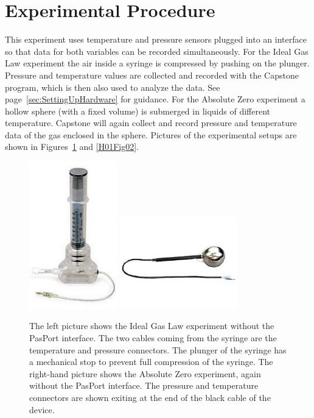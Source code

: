 \section{Experimental Procedure}

This experiment uses temperature and pressure sensors plugged into an interface so that data for both variables can be recorded simultaneously.
For the Ideal Gas Law experiment the air inside a syringe is compressed by pushing on the plunger. Pressure and temperature values are collected and recorded with the Capstone program, which is then also used to analyze the data. See page~\ref{sec:SettingUpHardware} for guidance.
For the Absolute Zero experiment a hollow sphere (with a fixed volume) is submerged in liquids of different temperature. Capstone will again collect and record pressure and temperature data of the gas enclosed in the sphere.
Pictures of the experimental setups are shown in Figures~\ref{H01Fig01} and \ref{H01Fig02}.

\begin{figure}
  \begin{center}
    \includegraphics[width=1.5in]{Experiment10Figures/Figure01a.pdf}\hspace{2cm}
    \includegraphics[width=2.0in]{Experiment10Figures/Figure01b.pdf}
  \end{center}
  \caption{The left picture shows the Ideal Gas Law experiment without the PasPort interface. The two cables coming from the syringe are the temperature and pressure connectors. The plunger of the syringe has a mechanical stop to prevent full compression of the syringe.
    The right-hand picture shows the Absolute Zero experiment, again without the PasPort interface. The pressure and temperature connectors are shown exiting at the end of the black cable of the device.}
  \label{H01Fig01}  %
\end{figure}

